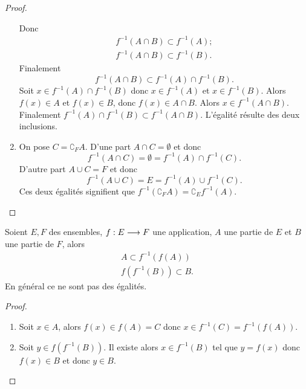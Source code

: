 \begin{proof}
\begin{enumerate}
            Donc
            \begin{gather}
                f^{-1}(A \cap B) \subset f^{-1}(A); \\ f^{-1}(A \cap B) \subset 
                f^{-1}(B).
            \end{gather}
            Finalement
            \begin{equation}
                f^{-1}(A \cap B) \subset f^{-1}(A) \cap f^{-1}(B).
            \end{equation}
            Soit \(x \in f^{-1}(A) \cap f^{-1}(B)\) donc \(x \in f^{-1}(A)\) et 
            \(x \in f^{-1}(B)\). Alors \(f(x) \in A\) et \(f(x) \in B\), donc 
            \(f(x) \in A \cap B\). Alors \(x \in f^{-1}(A \cap B)\). Finalement 
            \(f^{-1}(A) \cap f^{-1}(B) \subset f^{-1}(A \cap B)\). L'égalité 
            résulte des deux inclusions.
        \item On pose \(C=\complement_F A\). D'une part \(A \cap C =\emptyset\) 
            et donc
            \begin{equation}
                f^{-1}(A \cap C)=\emptyset=f^{-1}(A) \cap f^{-1}(C).
            \end{equation}
            D'autre part \(A \cup C =F\) et donc
            \begin{equation}
                f^{-1}(A \cup C) = E = f^{-1}(A) \cup f^{-1}(C).
            \end{equation}
            Ces deux égalités signifient que \(f^{-1}(\complement_F A) = 
            \complement_E f^{-1}(A)\). 
    \end{enumerate}
\end{proof}

\begin{prop}
    Soient \(E,F\) des ensembles, \(f:E \longrightarrow F\) une application, \(A\) 
    une partie de \(E\) et \(B\) une partie de \(F\), alors
    \begin{gather}
        A \subset f^{-1}(f(A)) \\
        f(f^{-1}(B)) \subset B.
    \end{gather}
    En général ce ne sont pas des égalités.
\end{prop}
\begin{proof}
    \begin{enumerate}
        \item Soit \(x \in A\), alors \(f(x) \in f(A) = C\) donc \(x \in 
            f^{-1}(C)=f^{-1}(f(A))\).
        \item Soit \(y \in f(f^{-1}(B))\). Il existe alors \(x \in f^{-1}(B)\) 
            tel que \(y=f(x)\) donc \(f(x) \in B\) et donc \(y \in B\).
    \end{enumerate}
\end{proof}

